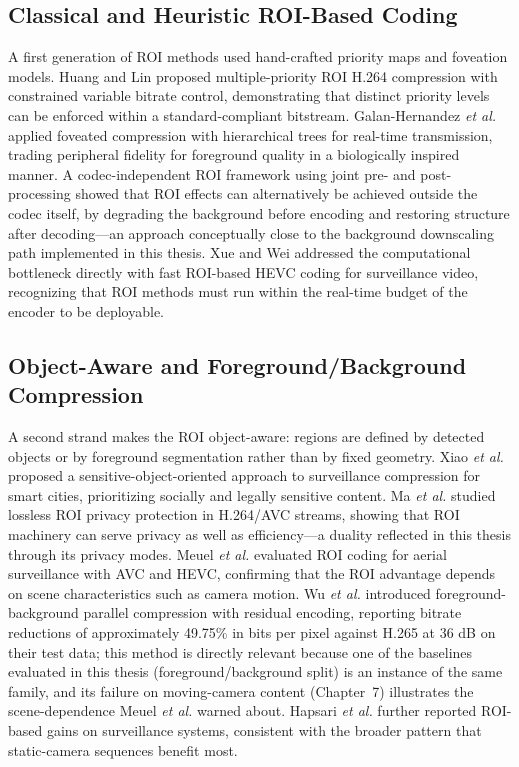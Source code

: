 \subsection{Classical and Heuristic ROI-Based Coding}

A first generation of ROI methods used hand-crafted priority maps and foveation models. Huang and Lin \cite{Huang2009MultiPriority} proposed multiple-priority ROI H.264 compression with constrained variable bitrate control, demonstrating that distinct priority levels can be enforced within a standard-compliant bitstream. Galan-Hernandez \textit{et al.} \cite{Galan2011Foveated} applied foveated compression with hierarchical trees for real-time transmission, trading peripheral fidelity for foreground quality in a biologically inspired manner. A codec-independent ROI framework using joint pre- and post-processing \cite{CodecIndependent2016} showed that ROI effects can alternatively be achieved outside the codec itself, by degrading the background before encoding and restoring structure after decoding---an approach conceptually close to the background downscaling path implemented in this thesis. Xue and Wei \cite{Xue2016FastROI} addressed the computational bottleneck directly with fast ROI-based HEVC coding for surveillance video, recognizing that ROI methods must run within the real-time budget of the encoder to be deployable.

\subsection{Object-Aware and Foreground/Background Compression}

A second strand makes the ROI object-aware: regions are defined by detected objects or by foreground segmentation rather than by fixed geometry. Xiao \textit{et al.} \cite{Xiao2017Sensitive} proposed a sensitive-object-oriented approach to surveillance compression for smart cities, prioritizing socially and legally sensitive content. Ma \textit{et al.} \cite{Ma2016Lossless} studied lossless ROI privacy protection in H.264/AVC streams, showing that ROI machinery can serve privacy as well as efficiency---a duality reflected in this thesis through its privacy modes. Meuel \textit{et al.} \cite{Meuel2018Aerial} evaluated ROI coding for aerial surveillance with AVC and HEVC, confirming that the ROI advantage depends on scene characteristics such as camera motion. Wu \textit{et al.} \cite{Wu2020FGBG} introduced foreground-background parallel compression with residual encoding, reporting bitrate reductions of approximately 49.75\% in bits per pixel against H.265 at 36 dB on their test data; this method is directly relevant because one of the baselines evaluated in this thesis (foreground/background split) is an instance of the same family, and its failure on moving-camera content (Chapter~7) illustrates the scene-dependence Meuel \textit{et al.} warned about. Hapsari \textit{et al.} \cite{Hapsari2022ROI} further reported ROI-based gains on surveillance systems, consistent with the broader pattern that static-camera sequences benefit most.

